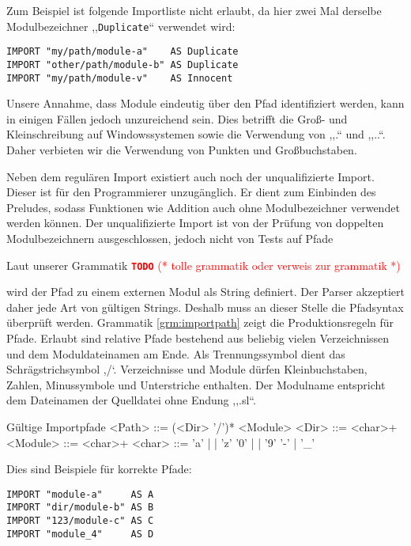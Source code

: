 \documentclass[runningheads]{llncs}
\newcommand{\TODO}[1]{ \textcolor{red}{\textbf{\texttt{\large{TODO}}} (* #1 *)}\par}
\begin{document}
Zum Beispiel ist folgende Importliste nicht erlaubt, da hier zwei Mal derselbe Modulbezeichner ,,\verb|Duplicate|`` verwendet wird:

\begin{verbatim}
IMPORT "my/path/module-a"    AS Duplicate
IMPORT "other/path/module-b" AS Duplicate
IMPORT "my/path/module-v"    AS Innocent
\end{verbatim}

Unsere Annahme, dass Module eindeutig über den Pfad identifiziert werden, kann in einigen Fällen jedoch unzureichend sein. Dies betrifft die Groß- und Kleinschreibung auf Windowssystemen sowie die Verwendung von ,,.`` und ,,..``. Daher verbieten wir die Verwendung von Punkten und Großbuchstaben.

Neben dem regulären Import existiert auch noch der unqualifizierte Import. Dieser ist für den Programmierer unzugänglich. Er dient zum Einbinden des Preludes, sodass Funktionen wie Addition auch ohne Modulbezeichner verwendet werden können. Der unqualifizierte Import ist von der Prüfung von doppelten Modulbezeichnern ausgeschlossen, jedoch nicht von Tests auf Pfade

Laut unserer Grammatik \TODO{tolle grammatik oder verweis zur grammatik} wird der Pfad zu einem externen Modul als String definiert. Der Parser akzeptiert daher jede Art von gültigen Strings. Deshalb muss an dieser Stelle die Pfadsyntax überprüft werden. Grammatik \ref{grm:importpath} zeigt die Produktionsregeln für Pfade. Erlaubt sind relative Pfade bestehend aus beliebig vielen Verzeichnissen und dem Moduldateinamen am Ende. Als Trennungssymbol dient das Schrägstrichsymbol ,/`. Verzeichnisse und Module dürfen Kleinbuchstaben, Zahlen, Minussymbole und Unterstriche enthalten. Der Modulname entspricht dem Dateinamen der Quelldatei ohne Endung ,,.sl``.

\begin{grammarfigure}{Gültige Importpfade}
  <Path>   ::= (<Dir> '/')* <Module>
  <Dir>    ::= <char>+
  <Module> ::= <char>+
  <char>   ::= 'a' | \cdots | 'z'
          \alt '0' | \cdots | '9'
          \alt '-' | '\_'
\end{grammarfigure}

Dies sind Beispiele für korrekte Pfade:

\begin{verbatim}
IMPORT "module-a"     AS A
IMPORT "dir/module-b" AS B
IMPORT "123/module-c" AS C
IMPORT "module_4"     AS D
\end{verbatim}
\end{document}
